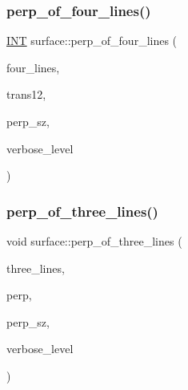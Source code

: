 \subsubsection{\texorpdfstring{perp\+\_\+of\+\_\+four\+\_\+lines()}{perp\_of\_four\_lines()}}
{\footnotesize\ttfamily \mbox{\hyperlink{galois_8h_a09fddde158a3a20bd2dcadb609de11dc}{I\+NT}} surface\+::perp\+\_\+of\+\_\+four\+\_\+lines (\begin{DoxyParamCaption}\item[{\mbox{\hyperlink{galois_8h_a09fddde158a3a20bd2dcadb609de11dc}{I\+NT}} $\ast$}]{four\+\_\+lines,  }\item[{\mbox{\hyperlink{galois_8h_a09fddde158a3a20bd2dcadb609de11dc}{I\+NT}} $\ast$}]{trans12,  }\item[{\mbox{\hyperlink{galois_8h_a09fddde158a3a20bd2dcadb609de11dc}{I\+NT}} \&}]{perp\+\_\+sz,  }\item[{\mbox{\hyperlink{galois_8h_a09fddde158a3a20bd2dcadb609de11dc}{I\+NT}}}]{verbose\+\_\+level }\end{DoxyParamCaption})}

\mbox{\label{classsurface_aaa43449a367799d405821a1cd5a7e644}} 
\subsubsection{\texorpdfstring{perp\+\_\+of\+\_\+three\+\_\+lines()}{perp\_of\_three\_lines()}}
{\footnotesize\ttfamily void surface\+::perp\+\_\+of\+\_\+three\+\_\+lines (\begin{DoxyParamCaption}\item[{\mbox{\hyperlink{galois_8h_a09fddde158a3a20bd2dcadb609de11dc}{I\+NT}} $\ast$}]{three\+\_\+lines,  }\item[{\mbox{\hyperlink{galois_8h_a09fddde158a3a20bd2dcadb609de11dc}{I\+NT}} $\ast$\&}]{perp,  }\item[{\mbox{\hyperlink{galois_8h_a09fddde158a3a20bd2dcadb609de11dc}{I\+NT}} \&}]{perp\+\_\+sz,  }\item[{\mbox{\hyperlink{galois_8h_a09fddde158a3a20bd2dcadb609de11dc}{I\+NT}}}]{verbose\+\_\+level }\end{DoxyParamCaption})}

\mbox{\label{classsurface_a64422316672eff36c60020cb6b5b0642}} 
